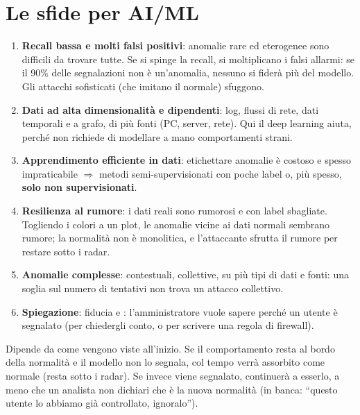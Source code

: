 \section{Le sfide per AI/ML}
\begin{enumerate}
  \item \textbf{Recall bassa e molti falsi positivi}: anomalie rare ed eterogenee sono difficili da trovare tutte. Se si spinge la recall, si
        moltiplicano i falsi allarmi: se il 90\% delle segnalazioni non è un'anomalia, nessuno si fiderà più del modello. Gli attacchi sofisticati
        (che imitano il normale) sfuggono.
  \item \textbf{Dati ad alta dimensionalità e dipendenti}: log, flussi di rete, dati temporali e a grafo, di più fonti (PC, server, rete).
        Qui il deep learning aiuta, perché non richiede di modellare a mano comportamenti strani.
  \item \textbf{Apprendimento efficiente in dati}: etichettare anomalie è costoso e spesso impraticabile $\Rightarrow$ metodi semi-supervisionati
        con poche label o, più spesso, \textbf{solo non supervisionati}.
  \item \textbf{Resilienza al rumore}: i dati reali sono rumorosi e con label sbagliate. Togliendo i colori a un plot, le anomalie vicine ai dati
        normali sembrano rumore; la normalità non è monolitica, e l'attaccante sfrutta il rumore per restare sotto i radar.
  \item \textbf{Anomalie complesse}: contestuali, collettive, su più tipi di dati e fonti: una soglia sul numero di tentativi non trova un
        attacco collettivo.
  \item \textbf{Spiegazione}: fiducia e : l'amministratore vuole sapere perché un utente è segnalato (per chiedergli conto, o per
        scrivere una regola di firewall).
\end{enumerate}
\begin{esempio}
Dipende da come vengono viste all'inizio. Se il comportamento resta al bordo della normalità e il modello non lo segnala, col tempo verrà
assorbito come normale (resta sotto i radar). Se invece viene segnalato, continuerà a esserlo, a meno che un analista non dichiari che è la nuova
normalità (in banca: ``questo utente lo abbiamo già controllato, ignoralo'').
\end{esempio}


